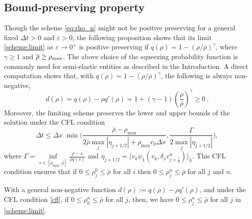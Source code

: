 \documentclass[review,onefignum,onetabnum]{siamart220329}
\newcommand {\e}  {\varepsilon}
\newcommand {\dt}   {\Delta t}
\begin{document}
\subsection{{Bound-preserving property}}
{ Though the scheme \cref{eq:rho_n} might not be positive preserving for a general fixed $\dt > 0$ and $\e>0$, 
the following proposition shows that its limit \cref{scheme:limit} as $\e\to 0^+$ is positive preserving if $q(\rho) = 1 - (\rho / \bar{\rho})^\gamma$, where $\gamma\ge1$ and $\overline{\rho}\ge\rho_{\rm{max}}$.
 The above choice of the squeezing probability function is commonly used  for semi-elastic entities as described in the Introduction. 
 A direct computation shows that, with $q(\rho)= 1 - (\rho / \bar{\rho})^\gamma$, the following is always non-negative, 
\begin{equation*}
    d(\rho)= q(\rho) - \rho q'(\rho) = 1 + (\gamma-1)\left(\frac{\rho}{\overline{\rho}}\right)^{\gamma} \ge 0\ .
\end{equation*}
Moreover, the limiting scheme preserves the lower and upper bounds of the solution under the CFL condition 
\begin{equation}\label{cfl}
\Delta t \leq \Delta x \; \min \big(\frac{\bar{\rho} - \rho_{\max}}{2 \bar{\rho} \max_j |\eta_{j+1/2}| + \rho_{\max} r_0 \Delta x}, \frac{\Gamma}{2 \max_j |\eta_{j+1/2}|} \big),
\end{equation}
\noindent where $\Gamma = \underset{s\in [\rho_{\max}, \bar{\rho}]}{\inf} \frac{\bar{\rho} - s}{\bar{\rho} q(s)}$ { and $\eta_{j+1/2}= \langle v_k \psi_1(v_k, \delta_x c_{j+\frac12}^n)\rangle_h$}. This CFL condition ensures that if $0 \leq \rho_j^0 \leq \bar{\rho}$ for all $i$ then $0 \leq \rho_j^n \leq \bar{\rho}$ for all $j$ and $n$.
}
\begin{proposition} 
 {   With a general non-negative function $d(\rho) :=q(\rho) - \rho q'(\rho)$, and under the CFL condition \eqref{cfl}, if $0 \leq \rho_0^n \leq \bar{\rho}$ for all $j$, then, we have 
    $0 \leq \rho_j^n \leq \bar{\rho}$ for all $j$ in \cref{scheme:limit}.}
\end{proposition}
\end{document}
